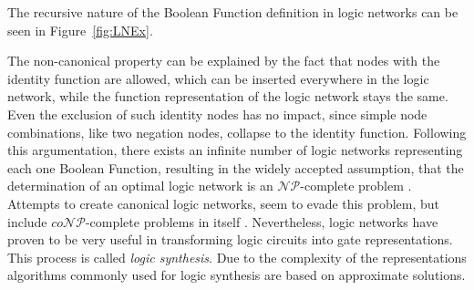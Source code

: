 The recursive nature of the Boolean Function definition in logic networks can be seen in Figure~\ref{fig:LNEx}.

The non-canonical property can be explained by the fact that nodes with the identity function are allowed, which can be inserted everywhere in the logic network, while the function representation of the logic network stays the same. Even the exclusion of such identity nodes has no impact, since simple node combinations, like two negation nodes, collapse to the identity function. Following this argumentation, there exists an infinite number of logic networks representing each one Boolean Function, resulting in the widely accepted assumption, that the determination of an optimal logic network is an $\mathcal{NP}$-complete problem \cite{Walter}. Attempts to create canonical logic networks, seem to evade this problem, but include $co\mathcal{NP}$-complete problems in itself \cite{LogicNetwork}.
Nevertheless, logic networks have proven to be very useful in transforming logic circuits into gate representations. This process is called \textit{logic synthesis}. Due to the complexity of the representations algorithms commonly used for logic synthesis are based on approximate solutions.




